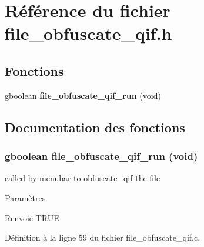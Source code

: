 \section{Référence du fichier file\_\-obfuscate\_\-qif.h}
\label{file__obfuscate__qif_8h}
\subsection*{Fonctions}
\begin{DoxyCompactItemize}
\item 
gboolean {\bf file\_\-obfuscate\_\-qif\_\-run} (void)
\end{DoxyCompactItemize}


\subsection{Documentation des fonctions}
\subsubsection[{file\_\-obfuscate\_\-qif\_\-run}]{\setlength{\rightskip}{0pt plus 5cm}gboolean file\_\-obfuscate\_\-qif\_\-run (void)}\label{file__obfuscate__qif_8h_a19232ad6d6ddf92d4640c3a897ebba9b}
called by menubar to obfuscate\_\-qif the file


\begin{DoxyParams}{Paramètres}
\item[{\em }]\end{DoxyParams}
\begin{DoxyReturn}{Renvoie}
TRUE 
\end{DoxyReturn}


Définition à la ligne 59 du fichier file\_\-obfuscate\_\-qif.c.

